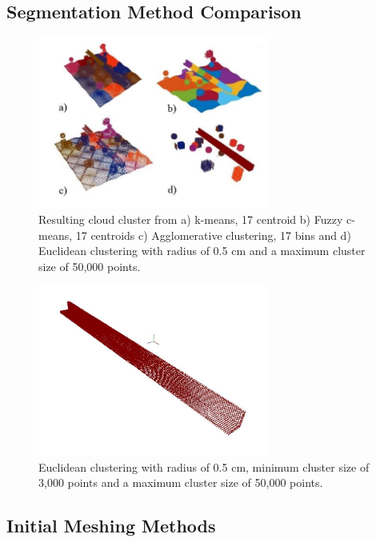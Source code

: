 \documentclass[12pt]{drexelthesis}
\let\Oldsubsection\subsection
\renewcommand{\subsection}{\FloatBarrier\Oldsubsection}
\begin{document}
\subsection{Segmentation Method Comparison}

\begin{figure}[!h]
	\label{zeronoise:segcompare}
	\centering
		\includegraphics[width=3in]{simulated-lab-scan/0noise/all_methods.jpg}
		\caption[Comparison of unsupervised segmentation techniques on a simulated dataset.]{\centering Resulting cloud cluster from a) k-means, 17 centroid b) Fuzzy c-means, 17 centroids c) Agglomerative clustering, 17 bins and d) Euclidean clustering with radius of 0.5 cm and a maximum cluster size of 50,000 points.}
\end{figure}



\begin{figure}[!h]
	\label{zeronoise:optimal}
	\centering
		\includegraphics[width=3in]{simulated-lab-scan/0noise/euclidean-d05max50000min3000.jpg}
		\caption[Euclidean distance segmentation with ideal parameters.]{\centering  Euclidean clustering with radius of 0.5 cm, minimum cluster size of 3,000 points and a maximum cluster size of 50,000 points.}
\end{figure}


\subsection{Initial Meshing Methods}
\end{document}
